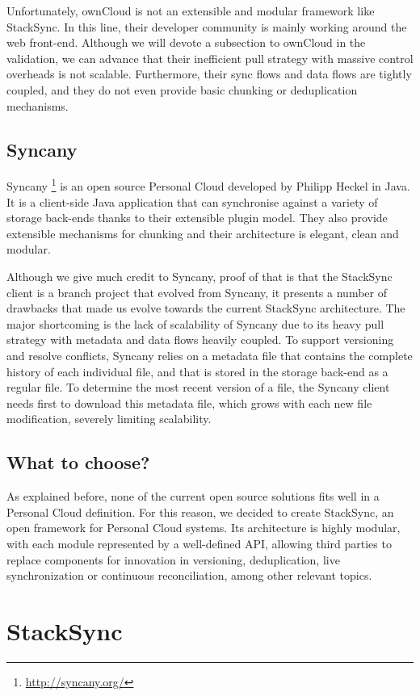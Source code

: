 Unfortunately, ownCloud is not an extensible and modular framework like StackSync. In this line, their developer community is mainly working around the web front-end. Although we will devote a subsection to ownCloud in the validation, we can advance that their inefficient pull strategy with massive control overheads is not scalable. Furthermore, their sync flows and data flows are tightly coupled, and they do not even provide basic chunking or deduplication mechanisms. 

\subsection{Syncany}
Syncany \footnote{\url{http://syncany.org/}} is an open source Personal Cloud developed by Philipp Heckel in Java. It is a client-side Java application that can synchronise against a variety of storage back-ends thanks to their extensible plugin model. They also provide extensible mechanisms for chunking and their architecture is elegant, clean and modular.

Although we give much credit to Syncany, proof of that is that the StackSync client is a branch project that evolved 
from Syncany, it presents a number of drawbacks that made us evolve towards the current StackSync architecture. 
The major shortcoming is the lack of scalability of Syncany due to its heavy pull strategy with metadata and
data flows heavily coupled. To support versioning and resolve conflicts, Syncany relies on a metadata file 
that contains the complete history of each individual file, and that is stored in the storage back-end
as a regular file. To determine the most recent version of a file, the Syncany client needs first to
download this metadata file, which grows with each new file modification, severely limiting scalability.

\subsection{What to choose?}
As explained before, none of the current open source solutions fits well in a Personal Cloud definition.
For this reason, we decided to create StackSync, an open framework for Personal Cloud systems. Its architecture is
highly modular, with each module represented by a well-defined API, allowing third parties to replace components
for innovation in versioning, deduplication, live synchronization or continuous reconciliation, among other
relevant topics.

\section{StackSync}

